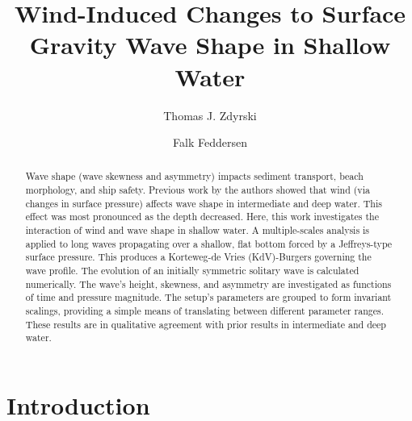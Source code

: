 \documentclass{jfm}
\title{Wind-Induced Changes to Surface Gravity Wave Shape in Shallow Water}
\author{Thomas J. Zdyrski \and Falk Feddersen}
\begin{document}
\maketitle

\begin{abstract}
Wave shape (\eg wave skewness and asymmetry) impacts sediment transport,
beach morphology, and ship safety.
Previous work by the authors showed that wind (via changes in surface
pressure) affects wave shape in intermediate and deep water.
This effect was most pronounced as the depth decreased.
Here, this work investigates the interaction of wind and wave shape in
shallow water.
A multiple-scales analysis is applied to long waves propagating over a
shallow, flat bottom forced by a Jeffreys-type surface pressure.
This produces a Korteweg-de Vries (KdV)-Burgers governing the wave
profile.
The evolution of an initially symmetric solitary wave is calculated
numerically.
The wave's height, skewness, and asymmetry are investigated as functions
of time and pressure magnitude.
The setup's parameters are grouped to form invariant scalings,
providing a simple means of translating between different parameter
ranges.
These results are in qualitative agreement with prior results in
intermediate and deep water.
\end{abstract}

\section{Introduction}
\end{document}
